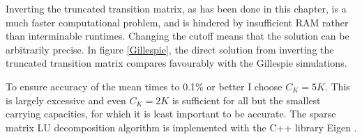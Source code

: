 Inverting the truncated transition matrix, as has been done in this chapter, is a much faster computational problem, and is hindered by insufficient RAM rather than interminable runtimes. 
Changing the cutoff means that the solution can be arbitrarily precise. 
In figure \ref{Gillespie}, the direct solution from inverting the truncated transition matrix compares favourably with the Gillespie simulations. 

To ensure accuracy of the mean times to 0.1\% or better I choose $C_K=5K$. 
This is largely excessive and even $C_K=2K$ is sufficient for all but the smallest carrying capacities, for which it is least important to be accurate. 
The sparse matrix LU decomposition algorithm is implemented with the C++ library Eigen \cite{eigenweb}. 


